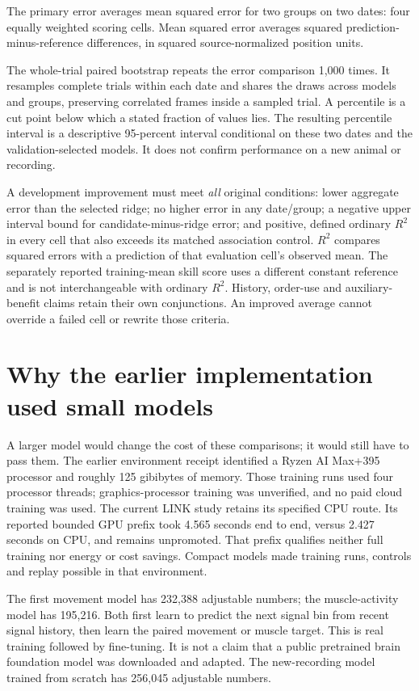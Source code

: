 The primary error averages mean squared error for two groups on two dates: four equally weighted scoring cells. Mean squared error averages squared prediction-minus-reference differences, in squared source-normalized position units.

The whole-trial paired bootstrap repeats the error comparison 1,000 times. It resamples complete trials within each date and shares the draws across models and groups, preserving correlated frames inside a sampled trial. A percentile is a cut point below which a stated fraction of values lies. The resulting percentile interval is a descriptive 95-percent interval conditional on these two dates and the validation-selected models. It does not confirm performance on a new animal or recording.

A development improvement must meet \emph{all} original conditions: lower
aggregate error than the selected ridge; no higher error in any date/group;
a negative upper interval bound for candidate-minus-ridge error; and positive,
defined ordinary $R^2$ in every cell that also exceeds its matched association
control. $R^2$ compares squared errors with a prediction of that evaluation
cell's observed mean. The separately reported training-mean skill score uses
a different constant reference and is not interchangeable with ordinary $R^2$.
History, order-use and auxiliary-benefit claims retain their own conjunctions.
An improved average cannot override a failed cell or rewrite those criteria.


\section{Why the earlier implementation used small models}

A larger model would change the cost of these comparisons; it would still have to pass them. The earlier environment receipt identified a Ryzen AI Max+395 processor and roughly 125 gibibytes of memory. Those training runs used four processor threads; graphics-processor training was unverified, and no paid cloud training was used. The current LINK study retains its specified CPU route. Its reported bounded GPU prefix took 4.565 seconds end to end, versus 2.427 seconds on CPU, and remains unpromoted. That prefix qualifies neither full training nor energy or cost savings. Compact models made training runs, controls and replay possible in that environment.

The first movement model has 232,388 adjustable numbers; the muscle-activity
model has 195,216. Both first learn to predict the next signal bin from recent
signal history, then learn the paired movement or muscle target. This is real
training followed by fine-tuning. It is not a claim that a public pretrained
brain foundation model was downloaded and adapted. The new-recording model
trained from scratch has 256,045 adjustable numbers.

